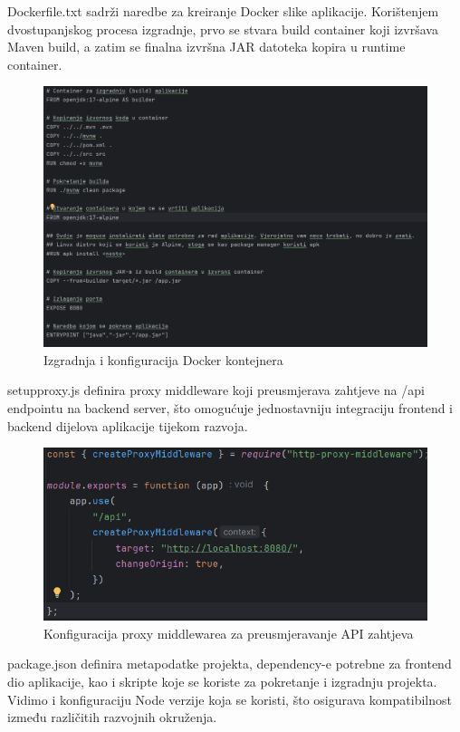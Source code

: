 		Dockerfile.txt sadrži naredbe za kreiranje Docker slike aplikacije. Korištenjem dvostupanjskog procesa izgradnje, prvo se stvara build container koji izvršava Maven build, a zatim se finalna izvršna JAR datoteka kopira u runtime container.

		\begin{figure} [H]
			\centering
			\includegraphics[width=0.7\linewidth]{slike/docker.png}
			\caption{Izgradnja i konfiguracija Docker kontejnera}
			\label{fig:Izgradnja i konfiguracija Docker kontejnera}
		\end{figure}

		setupproxy.js definira proxy middleware koji preusmjerava zahtjeve na /api endpointu na backend server, što omogućuje jednostavniju integraciju frontend i backend dijelova aplikacije tijekom razvoja.

		\begin{figure} [H]
			\centering
			\includegraphics[width=0.7\linewidth]{slike/setupproxy.png}
			\caption{Konfiguracija proxy middlewarea za preusmjeravanje API zahtjeva}
			\label{fig:Konfiguracija proxy middlewarea za preusmjeravanje API zahtjeva}
		\end{figure}

		package.json definira metapodatke projekta, dependency-e potrebne za frontend dio aplikacije, kao i skripte koje se koriste za pokretanje i izgradnju projekta. Vidimo i konfiguraciju Node verzije koja se koristi, što osigurava kompatibilnost između različitih razvojnih okruženja.

